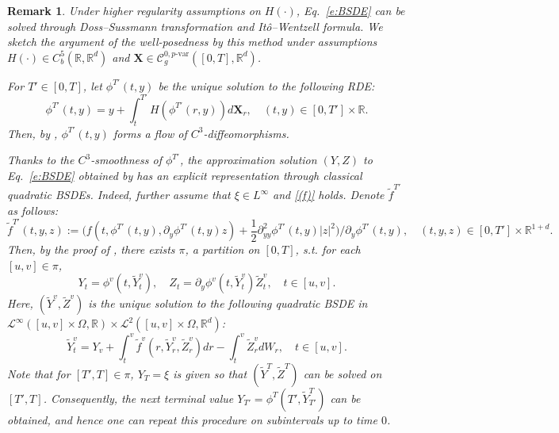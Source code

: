 \documentclass[11pt,reqno]{amsart}
\newtheorem{remark}[lemma]{Remark}
\numberwithin{equation}{section}
\def\R{\mathbb R}
\begin{document}
\begin{remark}\label{rem:under higher regularity}
Under higher regularity assumptions on $H(\bm\cdot)$, Eq.~\eqref{e:BSDE} can be solved through Doss--Sussmann transformation and It\^o--Wentzell formula. We sketch the argument of the well-posedness by this method under assumptions $H(\bm\cdot) \in C^{5}_b(\R,\R^d)$ and $\mathbf X \in \mathscr C^{0,p\text{-}\mathrm{var}}_{g}([0,T],\R^d)$. 

For $T' \in [0,T]$, let $\phi^{T'}(t,y)$ be the unique solution to the following RDE:
\begin{equation*}
\phi^{T'}(t,y) = y + \int_{t}^{T'} H(\phi^{T'}(r,y)) d\mathbf X_r, \quad (t,y) \in [0,T'] \times \R.
\end{equation*}
Then, by \cite[Proposition~11.11]{friz2010multidimensional}, $\phi^{T'}(t,y)$ forms a flow of $C^3$-diffeomorphisms. 

Thanks to the $C^3$-smoothness of $\phi^{T'}$, the approximation solution $(Y,Z)$ to Eq.~\eqref{e:BSDE} obtained by \cite[Theorem~3]{DF} has an explicit representation through classical quadratic BSDEs. Indeed, further assume that $\xi \in L^{\infty}$ and \ref{(f)} holds. Denote $\tilde{f}^{T'}$ as follows:
\begin{equation*}
\tilde{f}^{T'}(t,y,z) := \Big(f(t,\phi^{T'}(t,y),\partial_y \phi^{T'}(t,y) z) + \frac{1}{2} \partial^2_{yy} \phi^{T'}(t,y)|z|^2 \Big) / \partial_y \phi^{T'}(t,y),\quad (t,y,z) \in [0,T'] \times \R^{1+d}. 
\end{equation*}
Then, by the proof of \cite[Theorem~3]{DF}, there exists $\pi$, a partition on $[0,T]$, s.t. for each $[u,v] \in \pi$, 
\begin{equation*}
Y_t = \phi^{v}(t,\tilde Y^{v}_{t}),\quad Z_{t} = \partial_y\phi^{v}(t,\tilde Y^{v}_{t}) \tilde Z^{v}_t,\quad t \in [u,v].
\end{equation*}
Here, $(\tilde Y^v,\tilde Z^v)$ is the unique solution to the following quadratic BSDE in $\mathcal L^{\infty}([u,v]\times\Omega,\R) \times \mathcal L^{2}([u,v]\times\Omega,\R^d)$:
\begin{equation*}
\tilde Y^v_{t} = Y_v + \int_{t}^{v} \tilde f^{v}(r,\tilde Y^v_{r},\tilde Z^v_{r}) dr - \int_{t}^{v} \tilde Z^v_r dW_r,\quad t\in [u,v].
\end{equation*} 
Note that for $[T',T] \in \pi$, $Y_T = \xi$ is given so that $(\tilde Y^{T},\tilde Z^{T})$ can be solved on $[T',T]$. Consequently, the next terminal value $Y_{T'} = \phi^{T}(T',\tilde Y^{T}_{T'})$ can be obtained, and hence one can repeat this procedure on subintervals up to time $0$.  


\end{remark}
\end{document}
